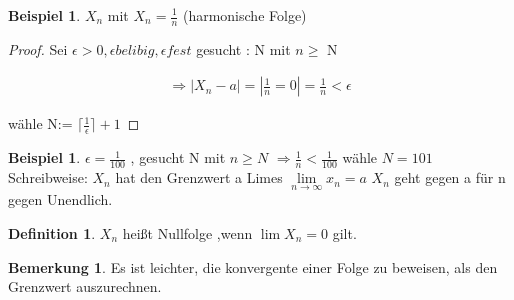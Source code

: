 \documentclass[a4paper,12pt,leqno]{report}
\theoremstyle{plain} %
\theoremstyle{definition} %
\newtheorem{remark}[theorem]{Bemerkung}
\newtheorem{definition}[theorem]{Definition}
\newtheorem{example}[theorem]{Beispiel}
\begin{document}
\begin{example}

$X_n$ mit $X_n = \frac{1}{n}$ (harmonische Folge)  

\end{example}

\begin{proof}
Sei $\epsilon > 0 , \epsilon belibig , \epsilon fest$
gesucht : N mit $n \geq$ N 
   
\begin{gather}
\Rightarrow |X_n-a|= |\frac{1}{n} =0|=\frac{1}{n}<\epsilon
\end{gather}

wähle N:= $\lceil \frac{1}{\epsilon} \rceil +1$  

\end{proof}

\begin{example}
$\epsilon = \frac{1}{100}$ , gesucht N mit $n \geq N$
$\Rightarrow \frac{1}{n} < \frac{1}{100}$ wähle $N=101$\\


Schreibweise: $X_n$ hat den Grenzwert a Limes 
$\lim\limits_{n \rightarrow \infty}{x_n}=a$ 
$X_n$ geht gegen a für n gegen Unendlich.
\end{example}

\begin{definition}
$X_n$ heißt Nullfolge ,wenn $\lim\limits{X_n}=0$ gilt. 
\end{definition}

\begin{remark}
 
Es ist leichter, die konvergente einer Folge zu beweisen, als den Grenzwert auszurechnen.   

\end{remark}
\end{document}
